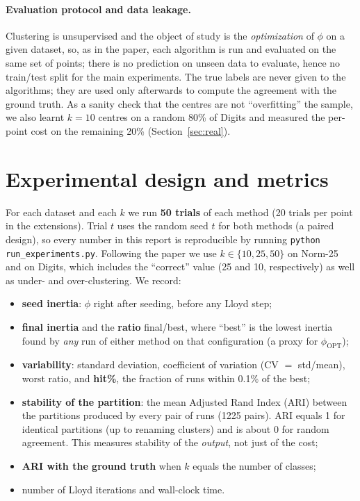 \documentclass[11pt,a4paper]{article}
\begin{document}
\paragraph{Evaluation protocol and data leakage.} Clustering is unsupervised and
the object of study is the \emph{optimization} of $\phi$ on a given dataset, so,
as in the paper, each algorithm is run and evaluated on the same set of points;
there is no prediction on unseen data to evaluate, hence no train/test split for
the main experiments. The true labels are never given to the algorithms; they are
used only afterwards to compute the agreement with the ground truth. As a sanity
check that the centres are not ``overfitting'' the sample, we also learnt
$k=10$ centres on a random 80\% of Digits and measured the per-point cost on the
remaining 20\% (Section~\ref{sec:real}).

\section{Experimental design and metrics}

For each dataset and each $k$ we run \textbf{50 trials} of each method
(20 trials per point in the extensions). Trial $t$ uses the random seed $t$ for both
methods (a paired design), so every number in this report is reproducible by
running \texttt{python run\_experiments.py}. Following the paper we use
$k\in\{10,25,50\}$ on Norm-25 and on Digits, which includes the ``correct'' value
(25 and 10, respectively) as well as under- and over-clustering. We record:
\begin{itemize}
\item \textbf{seed inertia}: $\phi$ right after seeding, before any Lloyd step;
\item \textbf{final inertia} and the \textbf{ratio} final/best, where ``best'' is the
lowest inertia found by \emph{any} run of either method on that configuration
(a proxy for $\phi_{\mathrm{OPT}}$);
\item \textbf{variability}: standard deviation, coefficient of variation
(CV $=$ std/mean), worst ratio, and \textbf{hit\%}, the fraction of runs within
0.1\% of the best;
\item \textbf{stability of the partition}: the mean Adjusted Rand Index (ARI)
between the partitions produced by every pair of runs (1225 pairs). ARI equals 1
for identical partitions (up to renaming clusters) and is about 0 for random
agreement. This measures stability of the \emph{output}, not just of the cost;
\item \textbf{ARI with the ground truth} when $k$ equals the number of classes;
\item number of Lloyd iterations and wall-clock time.
\end{itemize}
\end{document}
